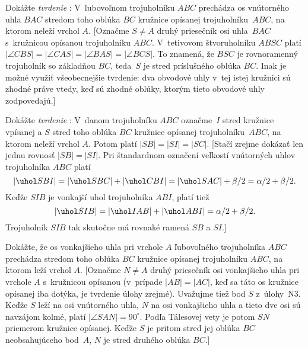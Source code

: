 {Dokážte {\it tvrdenie \/}:
V~ľubovoľnom trojuholníku $ABC$ prechádza os vnútorného uhla $BAC$ stredom
toho oblúka $BC$ kružnice opísanej trojuholníku~$ABC$, na ktorom neleží vrchol $A$.
[Označme $S\ne A$ druhý priesečník osi uhla~$BAC$ s~kružnicou
opísanou trojuholníku $ABC$. V~tetivovom štvoruholníku $ABSC$
platí $|\angle CBS| = |\angle CAS| = |\angle BAS| = |\angle BCS|$.
To znamená, že $BSC$ je rovnoramenný trojuholník so základňou $BC$,
teda~$S$ je stred príslušného oblúka $BC$. Inak je možné využiť
všeobecnejšie tvrdenie: dva obvodové uhly v~tej istej kružnici sú zhodné
práve vtedy, keď sú zhodné oblúky, ktorým tieto obvodové uhly
zodpovedajú.]

\D
Dokážte {\it tvrdenie \/}:
V~danom trojuholníku $ABC$ označme~$I$
stred kružnice vpísanej a $S$ stred toho oblúka $BC$
kružnice opísanej trojuholníku~$ABC$, na ktorom neleží vrchol $A$.
Potom platí $|SB|=|SI|=|SC|$.
[Stačí zrejme dokázať len jednu rovnosť $|SB|=|SI|$.
Pri štandardnom označení veľkostí vnútorných uhlov
trojuholníka $ABC$ platí
$$
|\uhol SBI| = |\uhol SBC| + |\uhol CBI| = |\uhol SAC| +
\beta/2 = \alpha/2 + \beta/2.
$$
Keďže $SIB$ je vonkajší uhol trojuholníka $ABI$, platí
tiež
$$
|\uhol SIB| = |\uhol IAB|+|\uhol ABI| = \alpha/2+\beta/2.
$$
Trojuholník $SIB$ tak skutočne má rovnaké ramená $SB$ a $SI$.]

Dokážte, že os vonkajšieho uhla pri vrchole $A$ ľubovoľného
trojuholníka $ABC$ prechádza stredom toho oblúka $BC$ kružnice
opísanej trojuholníku $ABC$, na ktorom leží vrchol $A$.
[Označme $N\ne A$ druhý priesečník osi vonkajšieho uhla pri vrchole $A$
s~kružnicou opísanou (v~prípade $|AB|=|AC|$, keď sa táto os
kružnice opísanej iba dotýka, je tvrdenie úlohy zrejmé).
Uvažujme tiež bod $S$ z~úlohy~N3. Keďže $S$ leží na osi
vnútorného uhla, $N$ na osi vonkajšieho uhla a tieto dve osi sú
navzájom kolmé, platí $|\angle SAN| = 90^\circ$. Podľa
Tálesovej vety je potom $SN$ priemerom kružnice opísanej.
Keďže $S$ je pritom stred jej oblúka $BC$
neobsahujúceho bod~$A$, $N$ je stred druhého oblúka $BC$.]

}
